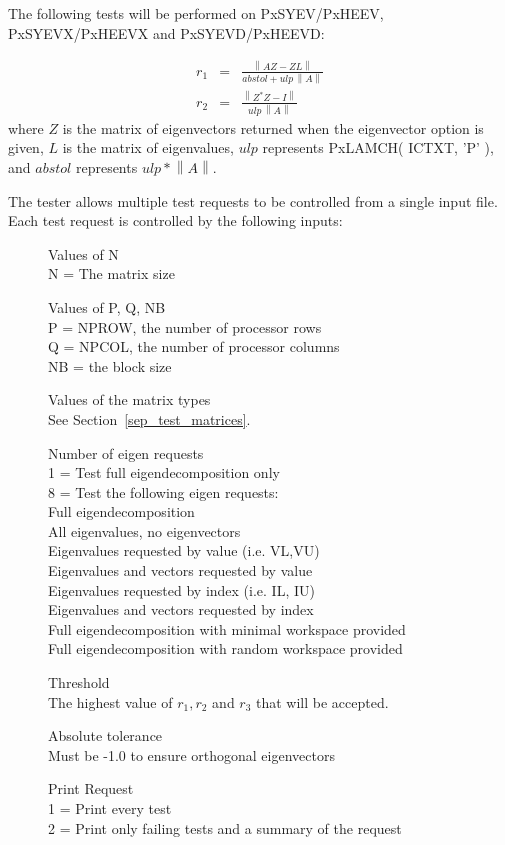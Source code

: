\documentclass[11pt]{report}
\newcommand{\dent}{\hspace*{\parindent}}
\newcommand{\leftnorm}{\left\|}
\newcommand{\rightnorm}{\right\|}
\begin{document}
\dent
The following tests will be performed on PxSYEV/PxHEEV, PxSYEVX/PxHEEVX and
PxSYEVD/PxHEEVD:

\begin{eqnarray}
          r_1&=&\frac{\leftnorm A Z - Z L \rightnorm}
                {abstol + ulp \, \leftnorm A \rightnorm} \nonumber\\[1ex] 
          r_2&=&\frac{\leftnorm Z^* Z - I \rightnorm}
                 {ulp \, \leftnorm A \rightnorm} \nonumber
\end{eqnarray}
where $Z$ is the matrix of eigenvectors returned when the
eigenvector option is given, $L$ is the matrix of eigenvalues,
$ulp$ represents PxLAMCH( ICTXT, 'P' ),
and $abstol$ represents $ulp \ast \leftnorm A
\rightnorm$.

The tester allows multiple test requests to be controlled from a 
single input file.  Each test request is controlled by the following inputs:

\begin{description}
\item[] Values of N \\
N = The matrix size
\item[] Values of P, Q, NB \\
P = NPROW, the number of processor rows \\
Q = NPCOL, the number of processor columns \\
NB = the block size
\item[] Values of the matrix types \\
See Section~\ref{sep_test_matrices}.
\item[] Number of eigen requests \\
1 = Test full eigendecomposition only \\
8 = Test the following eigen requests: \\
Full eigendecomposition \\
All eigenvalues, no eigenvectors \\
Eigenvalues requested by value (i.e. VL,VU) \\
Eigenvalues and vectors requested by value \\
Eigenvalues requested by index (i.e. IL, IU) \\
Eigenvalues and vectors requested by index \\
Full eigendecomposition with minimal workspace provided\\
Full eigendecomposition with random workspace provided
\item[] Threshold \\
The highest value of $r_1, r_2$ and $r_3$ that will be accepted.
\item[] Absolute tolerance \\
Must be -1.0 to ensure orthogonal eigenvectors
\item[] Print Request \\
1 = Print every test \\
2 = Print only failing tests and a summary of the request
\end{description}
\end{document}
